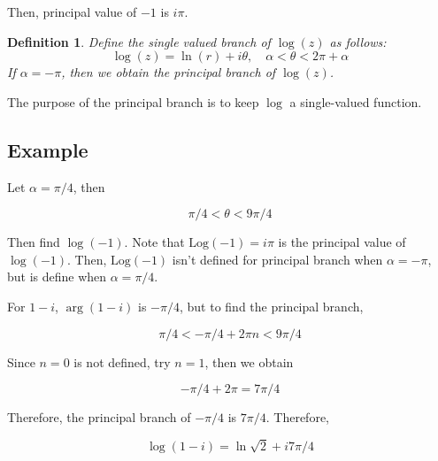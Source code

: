 \documentclass{article}
\newtheorem{definition}[theorem]{Definition}
\newtheorem{one minute paper}[theorem]{One Minute Paper}
\begin{document}
Then, principal value of $-1$ is $i\pi$. 

\begin{definition}
    Define the single valued branch of $\log(z)$ as follows:
    \begin{equation}
        \log(z) = \ln(r) + i\theta, \quad \alpha < \theta < 2\pi + \alpha
    \end{equation}
    If $\alpha = -\pi$, then we obtain the principal branch of $\log(z)$. 
\end{definition}

The purpose of the principal branch is to keep $\log$ a single-valued function. 

\subsection*{Example}

Let $\alpha = \pi/4$, then 

\begin{equation}
    \pi/4 < \theta < 9\pi/4
\end{equation}

Then find $\log(-1)$. Note that $\text{Log}(-1) = i\pi$ is the principal value of $\log(-1)$. Then, $\text{Log}(-1)$ isn't defined for principal branch when $\alpha = -\pi$, but is define when $\alpha = \pi/4$.

For $1-i$, $\arg(1-i)$ is $-\pi/4$, but to find the principal branch, 

\begin{equation}
    \pi/4 < -\pi/4 + 2\pi n < 9\pi/4
\end{equation}

Since $n=0$ is not defined, try $n=1$, then we obtain 

\begin{equation}
    -\pi/4 +  2\pi = 7\pi/4
\end{equation}

Therefore, the principal branch of $-\pi/4$ is $7\pi/4$. Therefore, 

\begin{equation}
    \log(1-i) = \ln \sqrt{2} + i7\pi/4 
\end{equation}
\end{document}
